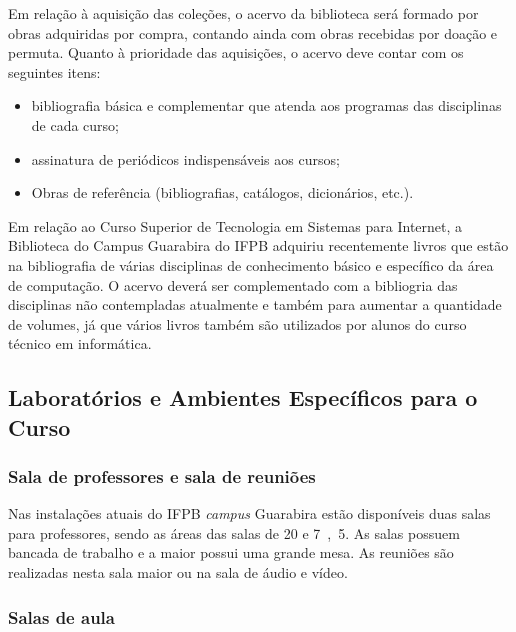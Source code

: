 Em relação à aquisição das coleções, o acervo da biblioteca será formado por obras adquiridas por compra, contando ainda com obras recebidas por doação e permuta. Quanto à prioridade das aquisições, o acervo deve contar com os seguintes itens: 

\begin{itemize}
	\item bibliografia básica e complementar que atenda aos programas das disciplinas de cada curso; 
	\item assinatura de periódicos indispensáveis aos cursos; 
	\item Obras de referência (bibliografias, catálogos, dicionários, etc.). 
\end{itemize}

Em relação ao Curso Superior de Tecnologia em Sistemas para Internet, a Biblioteca do Campus Guarabira do IFPB adquiriu recentemente livros que estão na bibliografia de várias disciplinas de conhecimento básico e específico da área de computação. O acervo deverá ser complementado com a bibliogria das disciplinas não contempladas atualmente e também para aumentar a quantidade de volumes, já que vários livros também são utilizados por alunos do curso técnico em informática.
 
\subsection{Laboratórios e Ambientes Específicos para o Curso}

\subsubsection{Sala de professores e sala de reuni\~oes}

Nas instalações atuais do IFPB \textit{campus} Guarabira estão disponíveis duas salas para professores, sendo as áreas das salas de \unit{20}{\squaremetre} e \unit{7,5}{\squaremetre}. As salas possuem bancada de trabalho e a maior possui uma grande mesa. As reuniões são realizadas nesta sala maior ou na sala de áudio e vídeo.


\subsubsection{Salas de aula}

